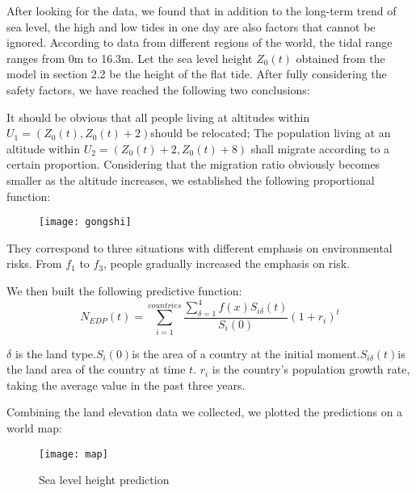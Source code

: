\documentclass{mcmthesis}
\begin{document}
After looking for the data, we found that in addition to the long-term trend of sea level, the high and low tides in one day are also factors that cannot be ignored. According to data from different regions of the world, the tidal range ranges from 0m to 16.3m. Let the sea level height $ Z_{0}(t) $ obtained from the model in section 2.2 be the height of the flat tide. After fully considering the safety factors, we have reached the following two conclusions:

It should be obvious that all people living at altitudes within $ U_{1}=(Z_{0}(t), Z_{0}(t)+2) $should be relocated;
The population living at an altitude within $ U_{2}=(Z_{0}(t)+2, Z_{0}(t)+8) $ shall migrate according to a certain proportion.
Considering that the migration ratio obviously becomes smaller as the altitude increases, we established the following proportional function:

\begin{figure}[h]%
	\small
	\centering
	\texttt{[image: gongshi]}%
\end{figure}


They correspond to three situations with different emphasis on environmental risks. From $ f_{1} $ to $ f_{3} $, people gradually increased the emphasis on risk.


We then built the following predictive function:
\begin{equation}
N_{EDP}(t)=\sum_{i=1}^{countries}\dfrac{\sum_{\delta=1}^{4}f(x)S_{i\delta}(t)}{S_{i}(0)}(1+r_{i})^t
\end{equation}

$\delta$ is the land type.$ S_{i}(0) $is the area of a country at the initial moment.$ S_{i\delta}(t) $is the land area of the country at time $ t $. $ r_{i} $ is the country's population growth rate, taking the average value in the past three years.

Combining the land elevation data we collected, we plotted the predictions on a world map:
\begin{figure}[h]%
	\small
	\centering
	\texttt{[image: map]}%
	\caption{Sea level height prediction} 
\end{figure}
\end{document}
